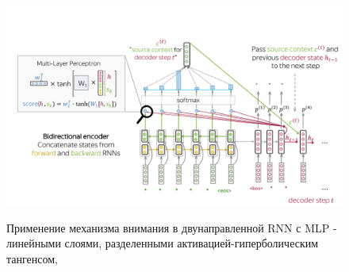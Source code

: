 \begin{figure}[h]
\caption{Применение механизма внимания в двунаправленной RNN с MLP - линейными слоями, разделенными активацией-гиперболическим тангенсом,\cite{Attention}}
\centering
\includegraphics[width=1\textwidth]{attn_usg.png}
\label{attn_usg}
\end{figure}

